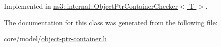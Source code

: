 Implemented in \hyperlink{classns3_1_1internal_1_1ObjectPtrContainerChecker_a772e8af042f7d22bc0cde4efe6123c89}{ns3\+::internal\+::\+Object\+Ptr\+Container\+Checker$<$ T $>$}.



The documentation for this class was generated from the following file\+:\begin{DoxyCompactItemize}
\item 
core/model/\hyperlink{object-ptr-container_8h}{object-\/ptr-\/container.\+h}\end{DoxyCompactItemize}
